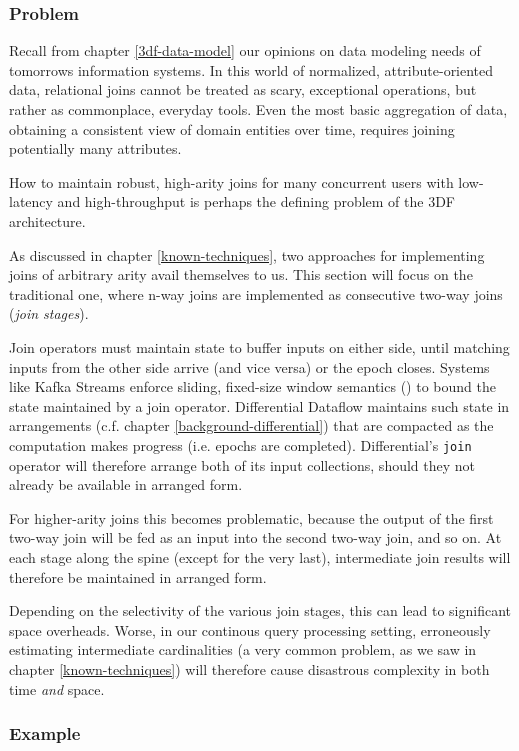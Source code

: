 \documentclass[../catalog.tex]{subfiles}
\begin{document}
\subsubsection{Problem}

Recall from chapter \ref{3df-data-model} our opinions on data modeling
needs of tomorrows information systems. In this world of normalized,
attribute-oriented data, relational joins cannot be treated as scary,
exceptional operations, but rather as commonplace, everyday
tools. Even the most basic aggregation of data, obtaining a consistent
view of domain entities over time, requires joining potentially many
attributes.

How to maintain robust, high-arity joins for many concurrent users
with low-latency and high-throughput is perhaps the defining problem
of the 3DF architecture.

As discussed in chapter \ref{known-techniques}, two approaches for
implementing joins of arbitrary arity avail themselves to us. This
section will focus on the traditional one, where n-way joins are
implemented as consecutive two-way joins (\emph{join stages}).

Join operators must maintain state to buffer inputs on either side,
until matching inputs from the other side arrive (and vice versa) or
the epoch closes. Systems like Kafka Streams enforce sliding,
fixed-size window semantics (\cite{kafkadocs}) to bound the state
maintained by a join operator. Differential Dataflow maintains such
state in arrangements (c.f. chapter \ref{background-differential})
that are compacted as the computation makes progress (i.e. epochs are
completed). Differential's \texttt{join} operator will therefore
arrange both of its input collections, should they not already be
available in arranged form.

For higher-arity joins this becomes problematic, because the output of
the first two-way join will be fed as an input into the second two-way
join, and so on. At each stage along the spine (except for the very
last), intermediate join results will therefore be maintained in
arranged form.

Depending on the selectivity of the various join stages, this can lead
to significant space overheads. Worse, in our continous query
processing setting, erroneously estimating intermediate cardinalities
(a very common problem, as we saw in chapter \ref{known-techniques})
will therefore cause disastrous complexity in both time \emph{and}
space.

\subsubsection{Example}
\end{document}
